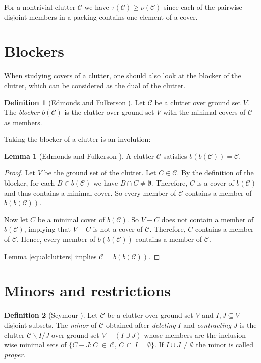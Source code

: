 \documentclass[a4paper, 12pt]{scrbook}
\theoremstyle{definition}
\newtheorem*{definition}{Definition}
\newtheorem{lemma}[theorem]{Lemma}
\begin{document}
For a nontrivial clutter $\mathcal{C}$ we have $\tau(\mathcal{C}) \geq \nu(\mathcal{C})$ since each of the pairwise disjoint members in a packing contains one element of a cover.

\section{Blockers}
When studying covers of a clutter, one should also look at the blocker of the clutter, which can be considered as the dual of the clutter.
\begin{definition}[Edmonds and Fulkerson \cite{blocker}]
    Let $\mathcal{C}$ be a clutter over ground set $V$.
    The \emph{blocker} $b(\mathcal{C})$ is the clutter over ground set $V$ with the minimal covers of $\mathcal{C}$ as members.
\end{definition}

Taking the blocker of a clutter is an involution:

\begin{lemma}[Edmonds and Fulkerson \cite{blocker}]
    A clutter $\mathcal{C}$ satisfies $b(b(\mathcal{C}))=\mathcal{C}$.
\end{lemma}

\begin{proof}
    Let $V$ be the ground set of the clutter.
    Let $C \in \mathcal{C}$.
    By the definition of the blocker, for each $B \in b(\mathcal{C})$ we have $B\cap C \neq \emptyset$.
    Therefore, $C$ is a cover of $b(\mathcal{C})$ and thus contains a minimal cover.
    So every member of $\mathcal{C}$ contains a member of $b(b(\mathcal{C}))$.

    Now let $C$ be a minimal cover of $b(\mathcal{C})$.
    So $V-C$ does not contain a member of $b(\mathcal{C})$, implying that $V-C$ is not a cover of $\mathcal{C}$.
    Therefore, $C$ contains a member of $\mathcal{C}$.
    Hence, every member of $b(b(\mathcal{C}))$ contains a member of $\mathcal{C}$.

    \hyperref[equalclutters]{Lemma \ref*{equalclutters}} implies $\mathcal{C}=b(b(\mathcal{C}))$.
\end{proof}


\section{Minors and restrictions}
\begin{definition}[Seymour \cite{binary}]
    Let $\mathcal{C}$ be a clutter over ground set $V$ and $I, J \subseteq V$ disjoint subsets.
    The \emph{minor} of $\mathcal{C}$ obtained after \emph{deleting} $I$ and \emph{contracting} $J$ is the clutter $\mathcal{C} \backslash I / J$ over ground set $V - (I \cup J)$ whose members are the inclusion-wise minimal sets of $\{C-J : C~\in~\mathcal{C},\, C~\cap~I = \emptyset\}$.
    If $I \cup J \neq \emptyset$ the minor is called \emph{proper}.
\end{definition}
\end{document}
